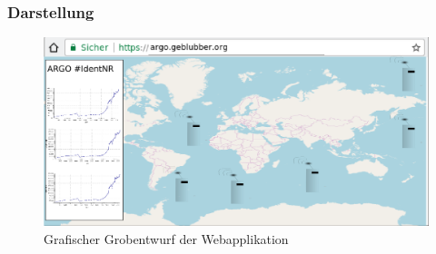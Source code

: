 
\subsubsection{Darstellung}
%
%


\begin{figure}[h!]
    \centering
    \includegraphics[width=\textwidth]{pix/EntwurfWebseite.png}
    \caption{Grafischer Grobentwurf der Webapplikation}
    \label{fig:entwurf_webseite}
\end{figure}

